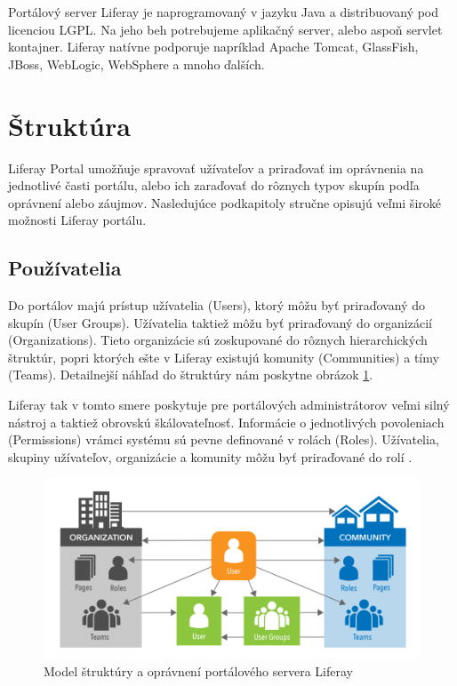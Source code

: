 \documentclass[
  digital, %
  twoside, %
  notable,   %
  nolof,   %
  nolot,   %
]{fithesis3}
\begin{document}
Portálový server Liferay je naprogramovaný v jazyku Java a distribuovaný pod licenciou LGPL. Na jeho beh potrebujeme aplikačný server, alebo aspoň servlet kontajner. Liferay natívne podporuje napríklad Apache Tomcat, GlassFish, JBoss, WebLogic, WebSphere a mnoho ďalších.

\section{Štruktúra}
Liferay Portal umožňuje spravovať užívateľov a priraďovať im oprávnenia na jednotlivé časti portálu, alebo ich zaraďovať do rôznych typov skupín podľa oprávnení alebo záujmov. Nasledujúce podkapitoly stručne opisujú veľmi široké možnosti Liferay portálu.

\subsection{Používatelia}
\label{liferay_users}
Do portálov majú prístup užívatelia (Users), ktorý môžu byť priraďovaný do skupín (User Groups). Užívatelia taktiež môžu byť priraďovaný do organizácií (Organizations). Tieto organizácie sú zoskupované do rôznych hierarchických štruktúr, popri ktorých ešte v Liferay existujú komunity (Communities) a tímy (Teams). Detailnejší náhľad do štruktúry nám poskytne obrázok \ref{liferay_structure}.

Liferay tak v tomto smere poskytuje pre portálových administrátorov veľmi silný nástroj a taktiež obrovskú škálovateľnosť. Informácie o jednotlivých povoleniach (Permissions) vrámci systému sú pevne definované v rolách (Roles). Užívatelia, skupiny užívateľov, organizácie a komunity môžu byť priraďované do rolí \cite{sezov2010portal}.

\begin{figure}[H]
	\center
	\includegraphics[width=1.0\linewidth]{liferay_structure}
	\caption{Model štruktúry a oprávnení portálového servera Liferay \cite{sezov2010portal}}
	\label{liferay_structure}
\end{figure}
\end{document}
